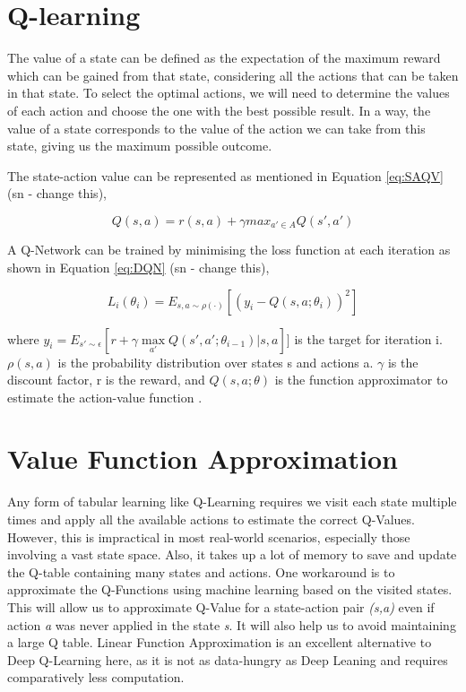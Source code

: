 \documentclass[logo,msc]{infthesis}           %
\begin{document}
 \section{Q-learning}

 The value of a state can be defined as the expectation of the maximum reward which can be gained from that state, considering all the actions that can be taken in that state. To select the optimal actions, we will need to determine the values of each action and choose the one with the best possible result. In a way, the value of a state corresponds to the value of the action we can take from this state, giving us the maximum possible outcome.

 The state-action value can be represented as mentioned in Equation \ref{eq:SAQV} (sn - change this),

\begin{equation}
Q(s,a) = r(s,a) + {\gamma} max_{a'\in A} Q(s',a')
\label{eq:SAQV}
\end{equation}
 
 A Q-Network can be trained by minimising the loss function at each iteration as shown in Equation \ref{eq:DQN} (sn - change this),

\begin{equation} L_{i}(\theta _{i}) = E_{s,a\sim\rho(\cdot)}[(y_{i} - Q(s,a;\theta _{i}))^2]
\label{eq:DQN}
\end{equation}

where \(y_{i} = E_{s'\sim\epsilon}[r+\gamma\max\limits_{{a'}}Q(s', a'; \theta_{i-1})|s, a]]\) is the target for iteration i. \(\rho(s,a)\) is the probability distribution over states s and actions a. \(\gamma\) is the discount factor, r is the reward, and \(Q(s,a;\theta)\) is the function approximator to estimate the action-value function \cite{DBLP:journals/corr/MnihKSGAWR13}.

\section{Value Function Approximation}

Any form of tabular learning like Q-Learning requires we visit each state multiple times and apply all the available actions to estimate the correct Q-Values. However, this is impractical in most real-world scenarios, especially those involving a vast state space. Also, it takes up a lot of memory to save and update the Q-table containing many states and actions. One workaround is to approximate the Q-Functions using machine learning based on the visited states\cite{580874}. This will allow us to approximate Q-Value for a state-action pair \textit{(s,a)} even if action \textit{a} was never applied in the state \textit{s}. It will also help us to avoid maintaining a large Q table. Linear Function Approximation \cite{P2} is an excellent alternative to Deep Q-Learning here, as it is not as data-hungry as Deep Leaning and requires comparatively less computation.
\end{document}
